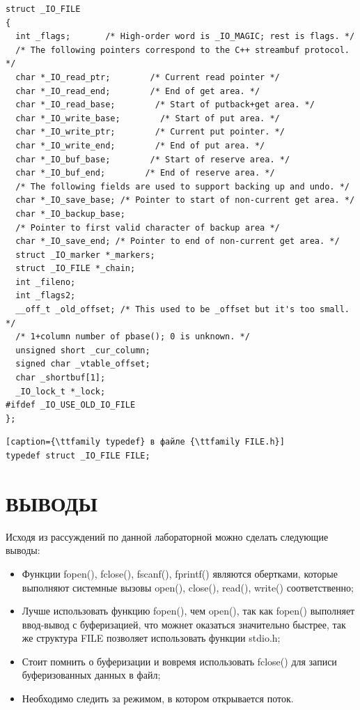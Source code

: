 \begin{lstlisting}[caption=Структура {\ttfamily \_IO\_FILE}]
struct _IO_FILE
{
  int _flags;       /* High-order word is _IO_MAGIC; rest is flags. */
  /* The following pointers correspond to the C++ streambuf protocol. */
  char *_IO_read_ptr;        /* Current read pointer */
  char *_IO_read_end;        /* End of get area. */
  char *_IO_read_base;        /* Start of putback+get area. */
  char *_IO_write_base;        /* Start of put area. */
  char *_IO_write_ptr;        /* Current put pointer. */
  char *_IO_write_end;        /* End of put area. */
  char *_IO_buf_base;        /* Start of reserve area. */
  char *_IO_buf_end;        /* End of reserve area. */
  /* The following fields are used to support backing up and undo. */
  char *_IO_save_base; /* Pointer to start of non-current get area. */
  char *_IO_backup_base;
  /* Pointer to first valid character of backup area */
  char *_IO_save_end; /* Pointer to end of non-current get area. */
  struct _IO_marker *_markers;
  struct _IO_FILE *_chain;
  int _fileno;
  int _flags2;
  __off_t _old_offset; /* This used to be _offset but it's too small.  */
  /* 1+column number of pbase(); 0 is unknown. */
  unsigned short _cur_column;
  signed char _vtable_offset;
  char _shortbuf[1];
  _IO_lock_t *_lock;
#ifdef _IO_USE_OLD_IO_FILE
};
\end{lstlisting}

\begin{lstlisting}[caption={\ttfamily typedef} в файле {\ttfamily FILE.h}]
typedef struct _IO_FILE FILE;
\end{lstlisting}

\section{ВЫВОДЫ}

Исходя из рассуждений по данной лабораторной можно сделать следующие выводы:

\begin{itemize}
    \item Функции {\ttfamily fopen(), fclose(), fscanf(), fprintf()} являются
        обертками, которые выполняют системные вызовы
        {\ttfamily open(), close(), read(), write()} соответственно;
    \item Лучше использовать функцию {\ttfamily fopen()}, чем {\ttfamily open()},
        так как {\ttfamily fopen()} выполняет ввод-вывод с буферизацией, что
        можнет оказаться значительно быстрее, так же структура {\ttfamily FILE}
        позволяет использовать функции {\ttfamily stdio.h};
    \item Стоит помнить о буферизации и вовремя использовать {\ttfamily fclose()}
        для записи буферизованных данных в файл;
    \item Необходимо следить за режимом, в котором открывается поток.
\end{itemize}

